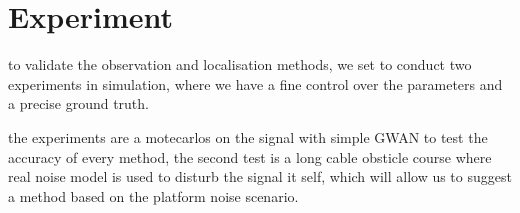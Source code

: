 \section{Experiment}
to validate the observation and localisation methods, we set to conduct two experiments in simulation, where we have a fine control over the parameters and a precise ground truth.

the experiments are a motecarlos on the signal with simple GWAN to test the accuracy of every method, the second test is a long cable obsticle course where real noise model is used to disturb the signal it self, which will allow us to suggest a method based on the platform noise scenario.

